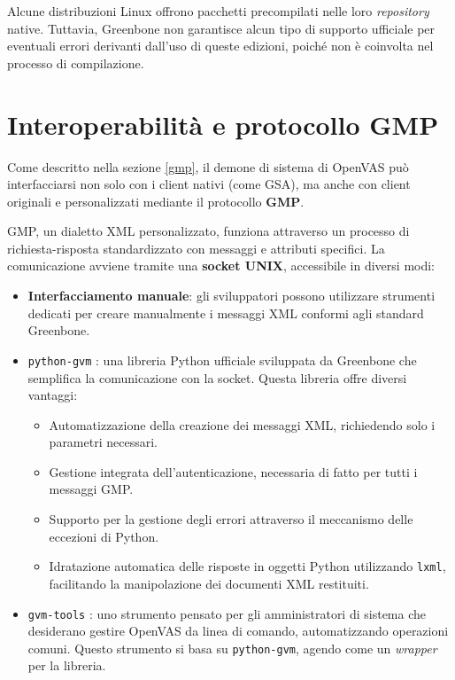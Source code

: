 Alcune distribuzioni Linux offrono pacchetti precompilati nelle loro \emph{repository} native. Tuttavia, Greenbone non garantisce alcun tipo di supporto ufficiale per eventuali errori derivanti dall'uso di queste edizioni, poiché non è coinvolta nel processo di compilazione.

\section{Interoperabilità e protocollo GMP}
\label{libraries}
Come descritto nella sezione \ref{gmp}, il demone di sistema di OpenVAS può interfacciarsi non solo con i client nativi (come GSA), ma anche con client originali e personalizzati mediante il protocollo \textbf{GMP}.

GMP, un dialetto XML personalizzato, funziona attraverso un processo di richiesta-risposta standardizzato con messaggi e attributi specifici. La comunicazione avviene tramite una \textbf{socket UNIX}, accessibile in diversi modi:

\begin{itemize}
    \item \textbf{Interfacciamento manuale}: gli sviluppatori possono utilizzare strumenti dedicati per creare manualmente i messaggi XML conformi agli standard Greenbone.

    \item \texttt{python-gvm} \cite{python-gvm}: una libreria Python ufficiale sviluppata da Greenbone che semplifica la comunicazione con la socket. Questa libreria offre diversi vantaggi:
    \begin{itemize}
        \item Automatizzazione della creazione dei messaggi XML, richiedendo solo i parametri necessari.
        \item Gestione integrata dell'autenticazione, necessaria di fatto per tutti i messaggi GMP.
        \item Supporto per la gestione degli errori attraverso il meccanismo delle eccezioni di Python.
        \item Idratazione automatica delle risposte in oggetti Python utilizzando \texttt{lxml}, facilitando la manipolazione dei documenti XML restituiti.
    \end{itemize}

    \item \texttt{gvm-tools} \cite{gvm-tools}: uno strumento pensato per gli amministratori di sistema che desiderano gestire OpenVAS da linea di comando, automatizzando operazioni comuni. Questo strumento si basa su \texttt{python-gvm}, agendo come un \emph{wrapper} per la libreria.
\end{itemize}
